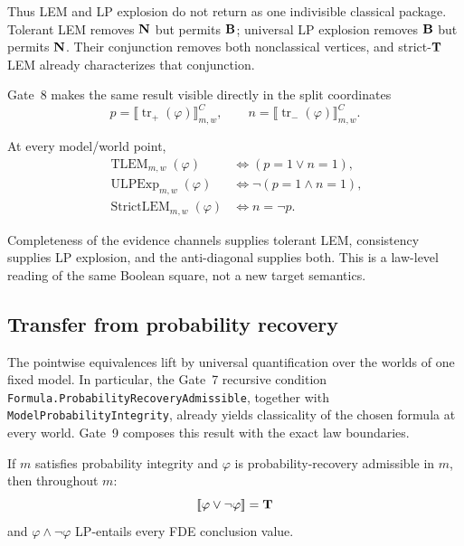 Thus LEM and LP explosion do not return as one indivisible classical package.
Tolerant LEM removes \(\mathbf{N}\) but permits \(\mathbf{B}\); universal LP explosion removes
\(\mathbf{B}\) but permits \(\mathbf{N}\). Their conjunction removes both nonclassical
vertices, and strict-\(\mathbf{T}\) LEM already characterizes that conjunction.

Gate~8 makes the same result visible directly in the split coordinates
\[
p=\llbracket\operatorname{tr}_{+}(\varphi)\rrbracket^C_{m,w},
\qquad
n=\llbracket\operatorname{tr}_{-}(\varphi)\rrbracket^C_{m,w}.
\]

\begin{corollary}
\label{cor:gate9-coordinate-laws}
At every model/world point,
\[
\boxed{
\begin{aligned}
\operatorname{TLEM}_{m,w}(\varphi)
&\Longleftrightarrow (p=1\lor n=1),\\
\operatorname{ULPExp}_{m,w}(\varphi)
&\Longleftrightarrow \neg(p=1\land n=1),\\
\operatorname{StrictLEM}_{m,w}(\varphi)
&\Longleftrightarrow n=\neg p.
\end{aligned}
}
\]
\statusverified
\end{corollary}

Completeness of the evidence channels supplies tolerant LEM, consistency supplies LP
explosion, and the anti-diagonal supplies both. This is a law-level reading of the
same Boolean square, not a new target semantics.

\subsection{Transfer from probability recovery}

The pointwise equivalences lift by universal quantification over the worlds of one
fixed model. In particular, the Gate~7 recursive condition
\texttt{Formula.ProbabilityRecoveryAdmissible}, together with
\texttt{ModelProbabilityIntegrity}, already yields classicality of the chosen
formula at every world. Gate~9 composes this result with the exact law boundaries.

\begin{corollary}
\label{cor:gate9-probability-laws}
If \(m\) satisfies probability integrity and \(\varphi\) is probability-recovery
admissible in \(m\), then throughout \(m\):
\[
\mathopen{[\![}\varphi\lor\neg\varphi\mathclose{]\!]}=\mathbf{T}
\]
and \(\varphi\land\neg\varphi\) LP-entails every FDE conclusion value.
\statusverified
\end{corollary}

